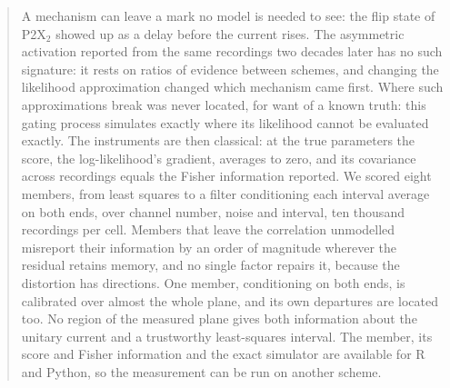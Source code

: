 
\begin{abstract}
A mechanism can leave a mark no model is needed to see: the flip state of P2X$_2$ showed up as a delay before the current rises. The asymmetric activation reported from the same recordings two decades later has no such signature: it rests on ratios of evidence between schemes, and changing the likelihood approximation changed which mechanism came first. Where such approximations break was never located, for want of a known truth: this gating process simulates exactly where its likelihood cannot be evaluated exactly. The instruments are then classical: at the true parameters the score, the log-likelihood's gradient, averages to zero, and its covariance across recordings equals the Fisher information reported. We scored eight members, from least squares to a filter conditioning each interval average on both ends, over channel number, noise and interval, ten thousand recordings per cell. Members that leave the correlation unmodelled misreport their information by an order of magnitude wherever the residual retains memory, and no single factor repairs it, because the distortion has directions. One member, conditioning on both ends, is calibrated over almost the whole plane, and its own departures are located too. No region of the measured plane gives both information about the unitary current and a trustworthy least-squares interval. The member, its score and Fisher information and the exact simulator are available for R and Python, so the measurement can be run on another scheme.
\end{abstract}
